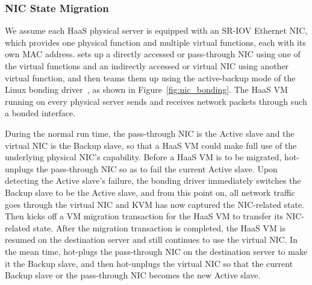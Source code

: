 \subsubsection{NIC State Migration}

We assume each HaaS physical server is equipped with an SR-IOV Ethernet NIC,
which provides one physical function and multiple virtual functions, each with its own MAC address.
\na sets up a directly accessed or pass-through NIC using one of the virtual functions
and an indirectly accessed or virtual NIC using another virtual function,
and then teams them up using the active-backup mode of the Linux bonding driver~\cite{bond-dri}, as shown in Figure~\ref{fig:nic_bonding}.
The HaaS VM running on every \na physical server sends and receives network packets through such a bonded interface. 


During the normal run time, the pass-through NIC is the Active slave and the virtual NIC is the Backup slave,
so that a HaaS VM could make full use of the underlying physical NIC's capability.
Before a HaaS VM is to be migrated, \na hot-unplugs the pass-through NIC so as to fail the current Active slave.
Upon detecting the Active slave's failure, the bonding driver immediately switches the Backup slave to be the Active slave,
and from this point on, all network traffic goes through the virtual NIC and KVM has now captured the NIC-related state. Then \na kicks off a VM migration transaction for the HaaS VM to transfer its NIC-related state.
After the migration transaction is completed, the HaaS VM is resumed on the destination server and still continues to use the virtual NIC.
In the mean time, \na hot-plugs the pass-through NIC on the destination  server to make it the Backup slave, and then hot-unplugs the virtual NIC so that the current Backup slave or the pass-through  NIC becomes the new Active slave.


